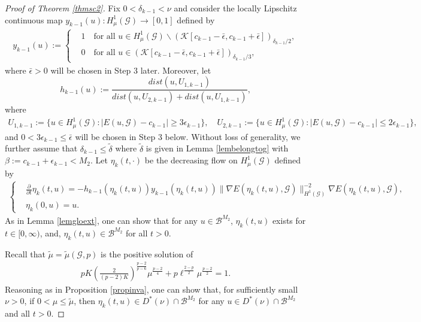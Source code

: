 \documentclass[10pt,a4paper]{article}
\theoremstyle{definition} \theoremstyle{remark}
\numberwithin{equation}{section}
\newcommand{\G}{\mathcal{G}}
\newcommand{\B}{\mathcal{B}}
\begin{document}
\begin{proof}[Proof of Theorem \ref{thmsc2}]
	Fix $0 < \delta_{k-1} < \nu$ and consider the locally Lipschitz continuous map $y_{k-1}(u): H^1_\mu(\G) \to [0,1]$ defined by
	\begin{align*}
		y_{k-1}(u) :=
		\left\{
		\begin{aligned}
			& 1 \quad \text{for all } u \in H^1_\mu(\G) \backslash(\mathcal{K}[c_{k-1}-\bar{\epsilon},c_{k-1}+\bar{\epsilon}])_{\delta_{k-1}/2}, \\
			& 0 \quad \text{for all } u \in (\mathcal{K}[c_{k-1}-\bar{\epsilon},c_{k-1}+\bar{\epsilon}])_{\delta_{k-1}/3},
		\end{aligned}
		\right.
	\end{align*}
    where $\bar \epsilon >0$ will be chosen in Step 3 later. Moreover, let
		$$h_{k-1}(u):= \frac{dist(u,U_{1,k-1})}{dist(u,U_{2,k-1})+dist(u,U_{1,k-1})},$$
		where
    	\begin{align*}
    	U_{1,k-1} := \bigl\{u \in H^1_\mu(\G): |E(u, \G) - c_{k-1}| \geq 3 \epsilon_{k-1}\bigr\}, \quad U_{2,k-1} := 
			\bigl\{u \in H^1_\mu(\G): |E(u,\G) - c_{k-1}| \leq 2 \epsilon_{k-1}\bigr\}, 
    \end{align*}
    and $0< 3\epsilon_{k-1} \leq \bar{\epsilon}$ will be chosen in Step 3 below. Without loss of generality, we further assume that $\delta_{k-1} \leq \tilde{\delta}$ where $\tilde \delta$ is given in Lemma \ref{lembelongtog} with $\beta := c_{k-1} + \epsilon_{k-1} < M_2$. Let $\eta_k(t,\cdot)$ be the decreasing flow on $H^1_\mu(\G)$ defined by
	\begin{align*}
		\left\{
		\begin{aligned}
			& \frac{\partial}{\partial t}\eta_k(t,u) = -h_{k-1}(\eta_k(t,u))y_{k-1}(\eta_k(t,u))\|\nabla E(\eta_k(t,u),\G)\|_{H^1(\G)}^{-2}\nabla E(\eta_k(t,u),\G), \\
			& \eta_k(0,u) = u.
		\end{aligned}
		\right.
	\end{align*}
	As in Lemma \ref{lemgloext}, one can show that for any  $u \in \B^{M_2}$, $\eta_k(t,u)$ exists for $t \in [0,\infty)$, and, $\eta_k(t,u) \in \B^{M_2}$ for all $t > 0$.
	
	Recall that $\tilde{\mu} = \tilde{\mu}(\G,p)$ is the positive solution of 
	\begin{align*}
		pK\left( \frac2{(p-2)K}\right)^{\frac{p-2}{p-6}}\mu^{\frac{p-2}4} + p\ell^{\frac{2-p}2}\mu^{\frac{p-2}2} = 1.
	\end{align*}
   Reasoning as in Proposition \ref{propinva}, one can show that, for sufficiently small $\nu > 0$, if $0 < \mu \leq \tilde{\mu}$, then $\eta_k(t,u) \in D^*(\nu) \cap \B^{M_2}$ for any $u \in D^*(\nu) \cap \B^{M_2}$ and all $t > 0$.
	

\end{proof}
\end{document}

